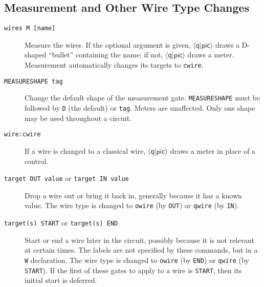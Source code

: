 \documentclass[twoside,12pt]{article}
\newcommand{\qpic}{$\langle\mathsf{q}|\mathsf{pic}\rangle$\xspace}
\begin{document}
\subsection{Measurement and Other Wire Type Changes}
\label{sec-qpic-measure}\label{sec-qpic-start-end}
\begin{description}

\item[{\tt wires M [name]}] Measure the wires.  If the optional argument is given, \qpic draws a D-shaped ``bullet''
containing the name; if not, \qpic draws a meter.  Measurement automatically changes its targets to {\tt cwire}.

\begin{minipage}[b]{2in}

\end{minipage} \hfill 

\item[{\tt MEASURESHAPE tag}] Change the default shape of the measurement gate.
  {\tt MEASURESHAPE} must be followed by {\tt D} (the default) or {\tt tag}.
  Meters are unaffected.  Only one shape may be used throughout a circuit.

\begin{minipage}[b]{2in}

\end{minipage} \hfill 

\item[{\tt wire:cwire}] If a wire is changed to a classical wire, \qpic draws a meter in place of a control.

\begin{minipage}[b]{2in}

\end{minipage} \hfill 

\item[{\tt target OUT value} or {\tt target IN value}] Drop a wire out or bring it back in, generally because it has a known
value.  The wire type is changed to {\tt owire} (by {\tt OUT}) or {\tt qwire} (by {\tt IN}).

\begin{minipage}[b]{2in}

\end{minipage} \hfill 

\item[{\tt target(s) START} or {\tt target(s) END}] Start or end a wire later in the
  circuit, possibly because it is not relevant at certain times.  The labels are not
  specified by these commands, but in a {\tt W} declaration.  The wire type is changed
  to {\tt owire} (by {\tt END}) or {\tt qwire} (by {\tt START}).  If the first of these
  gates to apply to a wire is {\tt START}, then its initial start is deferred.


\end{description}
\end{document}
